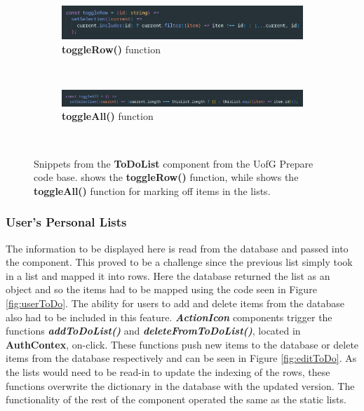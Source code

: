 \documentclass{l4proj}
\begin{document}
\begin{figure}[ht]
    \centering
    \begin{subfigure}[b]{0.9\textwidth}
        \includegraphics[width=\textwidth]{images/toggleRow.pdf}
        \caption{\textbf{toggleRow()} function}
        \label{fig:toggleRow}
    \end{subfigure}
    ~ %
    \begin{subfigure}[b]{0.9\textwidth}
        \includegraphics[width=\textwidth]{images/toggleAll.pdf}
        \caption{\textbf{toggleAll()} function}
        \label{fig:toggleAll}
    \end{subfigure}
    ~ %
    \caption{Snippets from the \textbf{ToDoList} component from the UofG Prepare code base.  shows the \textbf{toggleRow()} function,  while  shows the \textbf{toggleAll()} function for marking off items in the lists.
    }\label{fig:toggle}
\end{figure}

\subsubsection{User's Personal Lists} 
The information to be displayed here is read from the database and passed into the component. This proved to be a challenge since the previous list simply took in a list and mapped it into rows. Here the database returned the list as an object and so the items had to be mapped using the code seen in Figure \ref{fig:userToDo}. The ability for users to add and delete items from the database also had to be included in this feature. \textbf{\textit{ActionIcon}} components trigger the functions \textbf{\textit{addToDoList()}} and \textbf{\textit{deleteFromToDoList()}}, located in \textbf{AuthContex}, on-click. These functions push new items to the database or delete items from the database respectively and can be seen in Figure \ref{fig:editToDo}. As the lists would need to be read-in to update the indexing of the rows,  these functions overwrite the dictionary in the database with the updated version. The functionality of the rest of the component operated the same as the static lists.
\end{document}
